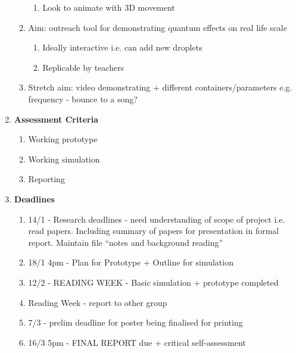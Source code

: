 \begin{enumerate}
\begin{enumerate}
\begin{enumerate}
\item  Look to animate with 3D movement
\end{enumerate}

\item  Aim: outreach tool for demonstrating quantum effects on real life scale

\begin{enumerate}
\item  Ideally interactive i.e. can add new droplets

\item  Replicable by teachers
\end{enumerate}

\item  Stretch aim: video demonstrating + different containers/parameters e.g. frequency - bounce to a song?\\
\end{enumerate}

\item  \textbf{Assessment Criteria}

\begin{enumerate}
\item Working prototype

\item  Working simulation

\item  Reporting\\
\end{enumerate}

\item  \textbf{Deadlines}

\begin{enumerate}
\item 14/1 - Research deadlines - need understanding of scope of project i.e. read papers. Including summary of papers for presentation in formal report. Maintain file ``notes and background reading''

\item  18/1 4pm - Plan for Prototype + Outline for simulation

\item  12/2 - READING WEEK - Basic simulation + prototype completed

\item  Reading Week - report to other group

\item  7/3 - prelim deadline for poster being finalised for printing

\item  16/3 5pm - FINAL REPORT due + critical self-assessment


\end{enumerate}
\end{enumerate}

